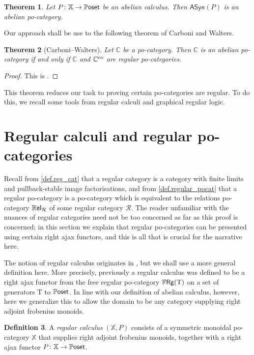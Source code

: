 \documentclass[11pt, oneside, article]{memoir}
\theoremstyle{plain}
\newtheorem{theorem}{Theorem}[chapter] %
\theoremstyle{definition}
\newtheorem{definition}[theorem]{Definition}
\theoremstyle{remark}
\newcommand{\Set}[1]{\mathrm{#1}}%
\newcommand{\cat}[1]{\mathcal{#1}}%
\newcommand{\Cat}[1]{{\mathsf{#1}}}%
\newcommand{\CCat}[1]{\mathbb{\StrLeft{#1}{1}}\Cat{\StrGobbleLeft{#1}{1}}}%
\newcommand{\Funr}[1]{\mathsf{#1}}%
\newcommand{\tn}[1]{\textnormal{#1}}
\newcommand{\co}{^{\tn{co}}}
\newcommand{\cc}{\mathbb{C}}
\newcommand{\xx}{\mathbb{X}}
\newcommand{\syn}{\Funr{ASyn}}
\newcommand{\abc}{P} %
\newcommand{\types}{\Set{T}}
\newcommand{\rrel}[1]{\CCat{Rel}_{#1}}
\newcommand{\pposet}{\CCat{Poset}}
\newcommand{\ffrg}[1][\types]{
  \ifthenelse{\equal{#1}{blank}}{\CCat{FRg}}{\CCat{FRg}(#1)}
}
\begin{document}
\begin{theorem} \label{thm.main}
  Let $\abc\colon \xx \to \pposet$ be an abelian calculus. Then $\syn(\abc)$ is an abelian po-category.
\end{theorem}

Our approach shall be use to the following theorem of Carboni and Walters.

\begin{theorem}[Carboni--Walters]
	Let $\cc$ be a po-category. Then $\cc$ is an abelian po-category if and only if $\cc$ and $\cc\co$ are regular po-categories.
\end{theorem}
\begin{proof}
	This is \cite[Theorem~5.2]{Carboni:1987a}.
\end{proof}

This theorem reduces our task to proving certain po-categories are regular. To do this, we recall some tools from regular calculi and graphical regular logic. 

\section{Regular calculi and regular po-categories}

Recall from \cref{def.reg_cat} that a regular category is a category with finite limits and pullback-stable image factorisations, and from \cref{def.regular_pocat} that a regular po-category is a po-category which is equivalent to the relations po-category $\rrel{\cat{R}}$ of some regular category $\cat{R}$. The reader unfamiliar with the nuances of regular categories need not be too concerned as far as this proof is concerned; in this section we explain that regular po-categories can be presented using certain right ajax functors, and this is all that is crucial for the narrative here. 

The notion of regular calculus originates in \cite{fong2018graphical}, but we shall use a more general definition here. More precisely, previously a regular calculus was defined to be a right ajax functor from the free regular po-category $\ffrg$ on a set of generators $\types$ to $\pposet$. In line with our definition of abelian calculus, however, here we generalize this to allow the domain to be any category supplying right adjoint frobenius monoids.

\begin{definition}
  A \emph{regular calculus} $(\xx,\abc)$ consists of a symmetric monoidal po-category $\xx$ that supplies right adjoint frobenius monoids, together with a right ajax functor $\abc\colon \xx \to \pposet$.
\end{definition}
\end{document}
